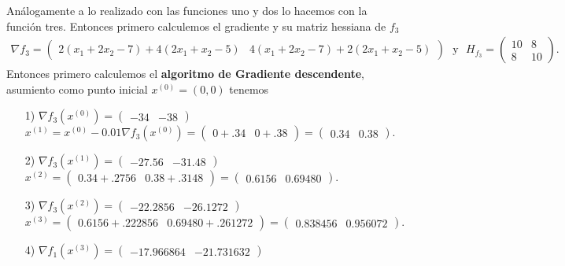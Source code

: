 \documentclass[11pt,letterpaper]{article}
\begin{document}
\begin{enumerate}
Análogamente a lo realizado con las funciones uno y dos lo hacemos con la función tres. Entonces primero calculemos el gradiente y su matriz hessiana de $f_3$
\begin{align*}
\nabla f_3 =\begin{pmatrix} 2(x_1+2x_2-7)+4(2x_1+x_2-5)&
4(x_1+2x_2-7)+2(2x_1+x_2-5)
\end{pmatrix} \ \ \ \text{y}\ \ \ H_{f_3}=\begin{pmatrix}
10 & 8\\ 8 & 10
\end{pmatrix}.
\end{align*}
Entonces primero calculemos el \textbf{algoritmo de Gradiente descendente}, asumiento como punto inicial $x^{(0)}=(0,0)$ tenemos 
\begin{enumerate}
\item[1)] $\nabla f_3(x^{(0)})=\begin{pmatrix}
-34 & -38
\end{pmatrix}$\\
$x^{(1)}=x^{(0)}-0.01\nabla f_3(x^{(0)}) = \begin{pmatrix}
0+.34 & 0+.38
\end{pmatrix}=\begin{pmatrix}
0.34 & 0.38
\end{pmatrix}. $
\item[2)] $\nabla f_3(x^{(1)})=\begin{pmatrix}
-27.56 & -31.48
\end{pmatrix}$\\
$x^{(2)}= \begin{pmatrix}
0.34+.2756 & 0.38+.3148
\end{pmatrix}=\begin{pmatrix}
0.6156 & 0.69480
\end{pmatrix}.$
\item[3)] $\nabla f_3(x^{(2)})=\begin{pmatrix}
-22.2856 & -26.1272
\end{pmatrix}$\\
$x^{(3)}= \begin{pmatrix}
0.6156 +.222856& 0.69480+.261272
\end{pmatrix}=\begin{pmatrix}
0.838456 & 0.956072
\end{pmatrix}.$
\item[4)] $\nabla f_1(x^{(3)})=\begin{pmatrix}
-17.966864 & -21.731632
\end{pmatrix}$\\

\end{enumerate}
\end{enumerate}
\end{document}
